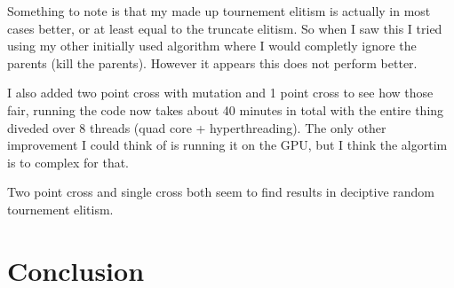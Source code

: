 \documentclass{article}
\begin{document}
\begin{empfile}
Something to note is that my made up tournement elitism is actually in most
cases better, or at least equal to the truncate elitism. So when I saw
this I tried using my other initially used algorithm where I would completly
ignore the parents (kill the parents). However it appears this does not 
perform better.

I also added two point cross with mutation and 1 point cross to see how 
those fair, running the code now takes about 40 minutes in total with the
entire thing diveded over 8 threads (quad core + hyperthreading). The only
other improvement I could think of is running it on the GPU, but I think
the algortim is to complex for that.

Two point cross and single cross both seem to find results in deciptive 
random tournement elitism.

\newpage


\section{Conclusion}
\end{empfile}
\end{document}

